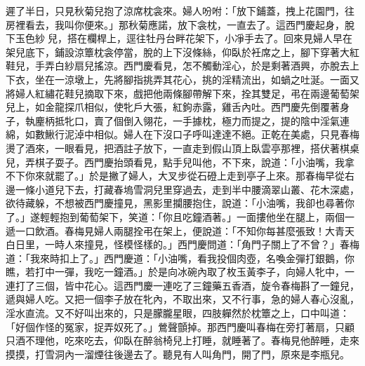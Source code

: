 遲了半日，只見秋菊兒抱了涼席枕衾來。婦人吩咐：「放下鋪蓋，拽上花園門，往房裡看去，我叫你便來。」那秋菊應諾，放下衾枕，一直去了。這西門慶起身，脫下玉色紗𧜽兒，搭在欄桿上，逕往牡丹台畔花架下，小凈手去了。回來見婦人早在架兒底下，鋪設涼簟枕衾停當，脫的上下沒條絲，仰臥於衽席之上，腳下穿著大紅鞋兒，手弄白紗扇兒搖涼。西門慶看見，怎不觸動淫心，於是剩著酒興，亦脫去上下衣，坐在一涼墩上，先將腳指挑弄其花心，挑的淫精流出，如蝸之吐涎。一面又將婦人紅繡花鞋兒摘取下來，戲把他兩條腳帶解下來，拴其雙足，弔在兩邊葡萄架兒上，如金龍探爪相似，使牝戶大張，紅鉤赤露，雞舌內吐。西門慶先倒覆著身子，執麈柄抵牝口，賣了個倒入翎花，一手據枕，極力而提之，提的陰中淫氣連綿，如數鰍行泥淖中相似。婦人在下沒口子呼叫達達不絕。正乾在美處，只見春梅燙了酒來，一眼看見，把酒註子放下，一直走到假山頂上臥雲亭那裡，搭伏著棋桌兒，弄棋子耍子。西門慶抬頭看見，點手兒叫他，不下來，說道：「小油嘴，我拿不下你來就罷了。」於是撇了婦人，大叉步從石磴上走到亭子上來。那春梅早從右邊一條小道兒下去，打藏春塢雪洞兒里穿過去，走到半中腰滴翠山叢、花木深處，欲待藏躲，不想被西門慶撞見，黑影里攔腰抱住，說道：「小油嘴，我卻也尋著你了。」遂輕輕抱到葡萄架下，笑道：「你且吃鐘酒著。」一面摟他坐在腿上，兩個一遞一口飲酒。春梅見婦人兩腿拴弔在架上，便說道：「不知你每甚麼張致！大青天白日里，一時人來撞見，怪模怪樣的。」西門慶問道：「角門子關上了不曾？」春梅道：「我來時扣上了。」西門慶道：「小油嘴，看我投個肉壺，名喚金彈打銀鵝，你瞧，若打中一彈，我吃一鐘酒。」於是向冰碗內取了枚玉黃李子，向婦人牝中，一連打了三個，皆中花心。這西門慶一連吃了三鐘藥五香酒，旋令春梅斟了一鐘兒，遞與婦人吃。又把一個李子放在牝內，不取出來，又不行事，急的婦人春心沒亂，淫水直流。又不好叫出來的，只是朦朧星眼，四肢軃然於枕簟之上，口中叫道：「好個作怪的冤家，捉弄奴死了。」鶯聲顫掉。那西門慶叫春梅在旁打著扇，只顧只酒不理他，吃來吃去，仰臥在醉翁椅兒上打睡，就睡著了。春梅見他醉睡，走來摸摸，打雪洞內一溜煙往後邊去了。聽見有人叫角門，開了門，原來是李瓶兒。

